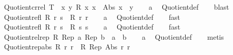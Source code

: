 \begin{isabellebody}
\ Quotient{\isacharunderscore}{\kern0pt}cr{\isacharunderscore}{\kern0pt}rel{\isacharcolon}{\kern0pt}\ {\isachardoublequoteopen}T\ {\isacharequal}{\kern0pt}\ {\isacharparenleft}{\kern0pt}{\isasymlambda}x\ y{\isachardot}{\kern0pt}\ R\ x\ x\ {\isasymand}\ Abs\ x\ {\isacharequal}{\kern0pt}\ y{\isacharparenright}{\kern0pt}{\isachardoublequoteclose}\isanewline
%
\isadelimproof
\ \ %
\endisadelimproof
%
\isatagproof
{}\isamarkupfalse%
\ a\ \isamarkupfalse%
\ Quotient{\isacharunderscore}{\kern0pt}def\isanewline
\ \ \isamarkupfalse%
\ blast%
\endisatagproof
{\isafoldproof}%
%
\isadelimproof
\isanewline
%
\endisadelimproof
\isanewline
{}\isamarkupfalse%
\ Quotient{\isacharunderscore}{\kern0pt}refl{}{\isacharcolon}{\kern0pt}\ {\isachardoublequoteopen}R\ r\ s\ {\isasymLongrightarrow}\ R\ r\ r{\isachardoublequoteclose}\isanewline
%
\isadelimproof
\ \ %
\endisadelimproof
%
\isatagproof
{}\isamarkupfalse%
\ a\ \isamarkupfalse%
\ Quotient{\isacharunderscore}{\kern0pt}def\isanewline
\ \ \isamarkupfalse%
\ fast%
\endisatagproof
{\isafoldproof}%
%
\isadelimproof
\isanewline
%
\endisadelimproof
\isanewline
{}\isamarkupfalse%
\ Quotient{\isacharunderscore}{\kern0pt}refl{}{\isacharcolon}{\kern0pt}\ {\isachardoublequoteopen}R\ r\ s\ {\isasymLongrightarrow}\ R\ s\ s{\isachardoublequoteclose}\isanewline
%
\isadelimproof
\ \ %
\endisadelimproof
%
\isatagproof
{}\isamarkupfalse%
\ a\ \isamarkupfalse%
\ Quotient{\isacharunderscore}{\kern0pt}def\isanewline
\ \ \isamarkupfalse%
\ fast%
\endisatagproof
{\isafoldproof}%
%
\isadelimproof
\isanewline
%
\endisadelimproof
\isanewline
{}\isamarkupfalse%
\ Quotient{\isacharunderscore}{\kern0pt}rel{\isacharunderscore}{\kern0pt}rep{\isacharcolon}{\kern0pt}\ {\isachardoublequoteopen}R\ {\isacharparenleft}{\kern0pt}Rep\ a{\isacharparenright}{\kern0pt}\ {\isacharparenleft}{\kern0pt}Rep\ b{\isacharparenright}{\kern0pt}\ {\isasymlongleftrightarrow}\ a\ {\isacharequal}{\kern0pt}\ b{\isachardoublequoteclose}\isanewline
%
\isadelimproof
\ \ %
\endisadelimproof
%
\isatagproof
{}\isamarkupfalse%
\ a\ \isamarkupfalse%
\ Quotient{\isacharunderscore}{\kern0pt}def\isanewline
\ \ \isamarkupfalse%
\ metis%
\endisatagproof
{\isafoldproof}%
%
\isadelimproof
\isanewline
%
\endisadelimproof
\isanewline
{}\isamarkupfalse%
\ Quotient{\isacharunderscore}{\kern0pt}rep{\isacharunderscore}{\kern0pt}abs{\isacharcolon}{\kern0pt}\ {\isachardoublequoteopen}R\ r\ r\ {\isasymLongrightarrow}\ R\ {\isacharparenleft}{\kern0pt}Rep\ {\isacharparenleft}{\kern0pt}Abs\ r{\isacharparenright}{\kern0pt}{\isacharparenright}{\kern0pt}\ r{\isachardoublequoteclose}\isanewline

\end{isabellebody}
